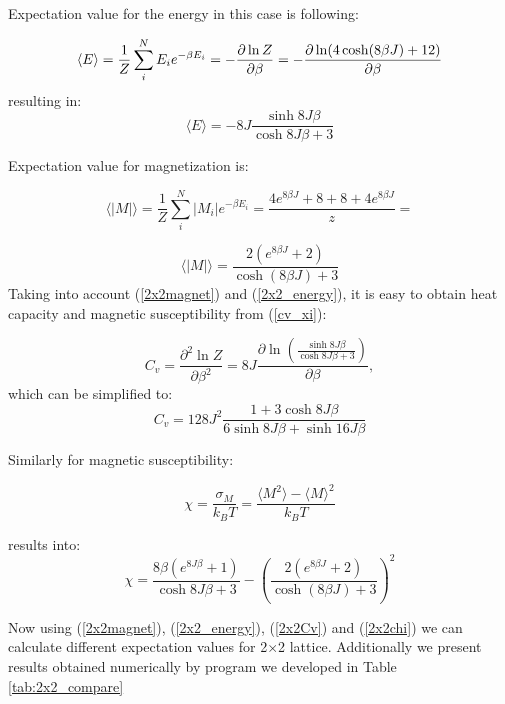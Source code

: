 \documentclass[10pt]{article}
\begin{document}
Expectation value for the energy in this case is following:

\[
\langle E\rangle =\frac{1}{Z}\sum_{i}^{N}E_{i}e^{-\beta E_{i}}=-\frac{%
\partial \ln Z}{\partial \beta }=-\frac{\partial \ln (4\cosh (8\beta J)+12)}{%
\partial \beta }
\]
resulting in:
\begin{equation}\label{2x2_energy}
\langle E\rangle=-8J\frac{\sinh 8J\beta }{\cosh 8J\beta +3}
\end{equation}

Expectation value for magnetization is:

\[
\langle \left\vert M\right\vert \rangle =\frac{1}{Z}\sum_{i}^{N}\left\vert
M_{i}\right\vert e^{-\beta E_{i}}=\frac{4e^{8\beta J}+8+8+4e^{8\beta J}}{z}=%
\]

\begin{equation}\label{2x2magnet}
\langle \left\vert M\right\vert \rangle=\frac{2(e^{8\beta J}+2)}{\cosh (8\beta J)+3}
\end{equation}
Taking into account (\ref{2x2magnet}) and (\ref{2x2_energy}), it is easy to obtain heat capacity and
magnetic susceptibility from (\ref{cv_xi}):

\[
C_{v}=\frac{\partial ^{2}\ln Z}{\partial\beta ^{2}}=8J\frac{\partial \ln (\frac{\sinh 8J\beta }{\cosh 8J\beta +3})}{\partial \beta },
\]
which can be simplified to:
\begin{equation}\label{2x2Cv}
C_{v}=128J^{2}\frac{1+3\cosh 8J\beta }{6\sinh 8J\beta +\sinh 16J\beta }
\end{equation}

Similarly for magnetic susceptibility:

\[
\chi=\frac{\sigma _{M}}{k_{B}T}=\frac{\langle M^{2}\rangle -\langle M\rangle ^{2}}{k_{B}T}
\]

results into:
\begin{equation}\label{2x2chi}
\chi=\frac{8\beta (e^{8J\beta }+1)}{\cosh 8J\beta +3}-\left( \frac{2(e^{8\beta J}+2)}{\cosh (8\beta J)+3}\right) ^{2}
\end{equation}

Now using (\ref{2x2magnet}), (\ref{2x2_energy}), (\ref{2x2Cv}) and (\ref{2x2chi}) we can calculate different expectation values for 2$\times$2 lattice. Additionally we present results obtained numerically by program we developed in Table \ref{tab:2x2_compare}
\end{document}
